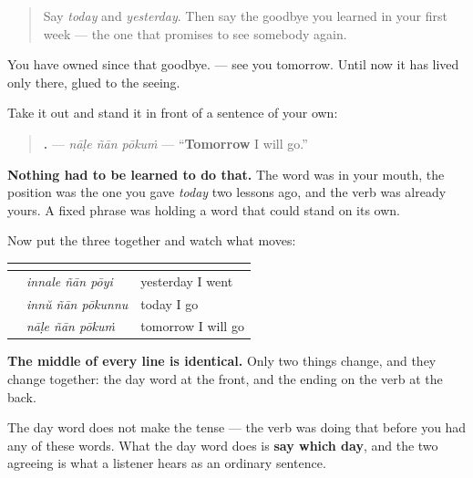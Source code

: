 \label{lesson:ML-C94-three-days}



\begin{quote}
Say \emph{today} and \emph{yesterday}. Then say the goodbye you learned in your first week — the one that promises to see somebody again.
\end{quote}

\begin{grammarlens}[title={Grammar Lens: a word walks out of a phrase}]
You have owned \textbf{} since that goodbye. \textbf{ } — see you tomorrow. Until now it has lived only there, glued to the seeing.

Take it out and stand it in front of a sentence of your own:

\begin{quote}
\textbf{  .} — \emph{nāḷe ñān pōkuṁ} — \textquotedblleft{}\textbf{Tomorrow} I will go.\textquotedblright{}
\end{quote}

\textbf{Nothing had to be learned to do that.} The word was in your mouth, the position was the one you gave \emph{today} two lessons ago, and the verb was already yours. A fixed phrase was holding a word that could stand on its own.
\end{grammarlens}

\begin{grammarlens}[title={Grammar Lens: three days, three endings, one shape}]
Now put the three together and watch what moves:

\noindent
\begin{tabularx}{\linewidth}{@{}>{\raggedright\arraybackslash}X>{\raggedright\arraybackslash}X>{\raggedright\arraybackslash}X@{}}
\toprule
\textbf{} & \textbf{} & \textbf{} \\
\midrule
\textbf{\ml{ഇന്നലെ} \ml{ഞാൻ} \ml{പോയി}} & \emph{innale ñān pōyi} & yesterday I went \\
\textbf{\ml{ഇന്ന്} \ml{ഞാൻ} \ml{പോകുന്നു}} & \emph{innŭ ñān pōkunnu} & today I go \\
\textbf{\ml{നാളെ} \ml{ഞാൻ} \ml{പോകും}} & \emph{nāḷe ñān pōkuṁ} & tomorrow I will go \\
\bottomrule
\end{tabularx}

\textbf{The middle of every line is identical.} Only two things change, and they change together: the day word at the front, and the ending on the verb at the back.

The day word does not make the tense — the verb was doing that before you had any of these words. What the day word does is \textbf{say which day}, and the two agreeing is what a listener hears as an ordinary sentence.
\end{grammarlens}

